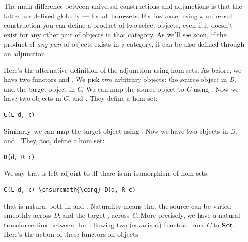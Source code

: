 The main difference between universal constructions and adjunctions is
that the latter are defined globally --- for all hom-sets. For instance,
using a universal construction you can define a product of two select
objects, even if it doesn't exist for any other pair of objects in that
category. As we'll see soon, if the product of \emph{any pair} of
objects exists in a category, it can be also defined through an
adjunction.

\begin{figure}[H]
\centering
{}
\end{figure}

\noindent
Here's the alternative definition of the adjunction using hom-sets. As
before, we have two functors  and
. We pick two arbitrary objects: the
source object  in \emph{D}, and the target object 
in \emph{C}. We can map the source object  to \emph{C} using
. Now we have two objects in \emph{C},  and
. They define a hom-set:

\begin{verbatim}
C(L d, c)
\end{verbatim}
Similarly, we can map the target object  using . Now
we have two objects in \emph{D},  and . They,
too, define a hom set:

\begin{verbatim}
D(d, R c)
\end{verbatim}
We say that  is left adjoint to  iff there is an
isomorphism of hom sets:

\begin{Verbatim}[commandchars=\\\{\}]
C(L d, c) \ensuremath{\cong} D(d, R c)
\end{Verbatim}
that is natural both in  and .
Naturality means that the source  can be varied smoothly
across \emph{D}; and the target , across \emph{C}. More
precisely, we have a natural transformation  between the
following two (covariant) functors from \emph{C} to \textbf{Set}. Here's
the action of these functors on objects:


